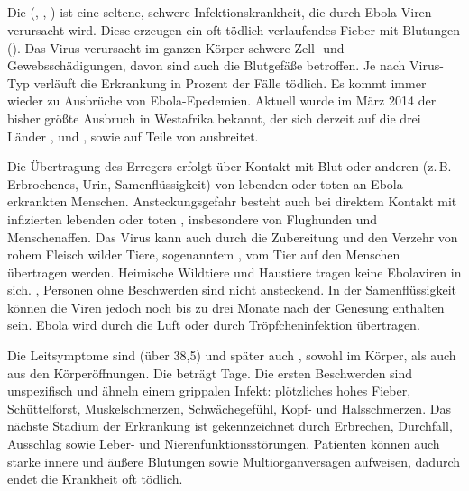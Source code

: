 \subsection{}

\Text{{\TxBeschreibung}}
{%
Die  
(, 
 , 
 ) 
ist eine seltene, 
schwere Infektionskrankheit, 
die durch Ebola-Viren
verursacht wird. 
%
Diese erzeugen ein oft tödlich verlaufendes Fieber 
mit Blutungen ().
Das Virus verursacht im ganzen Körper schwere Zell- und 
Gewebsschädigungen, davon sind auch die Blutgefäße betroffen. 
%
Je nach Virus-Typ verläuft die Erkrankung in  
Prozent der Fälle tödlich. 
%
Es kommt immer wieder zu Ausbrüche von Ebola-Epedemien.
%
Aktuell wurde im März 2014 der bisher größte Ausbruch in Westafrika bekannt, 
der sich derzeit auf 
die drei Länder
, 
und , 
sowie auf Teile von 
ausbreitet.



}
{}

{%
Die Übertragung des Erregers erfolgt über  Kontakt mit Blut 
oder anderen  
(z.\,B. Erbrochenes, Urin, Samenflüssigkeit) 
von lebenden oder toten an Ebola erkrankten
Menschen. 
%
Ansteckungsgefahr besteht auch bei direktem Kontakt mit infizierten lebenden 
oder toten , 
insbesondere von Flughunden und Menschenaffen.
% 
Das Virus kann auch durch die Zubereitung 
und den Verzehr von rohem Fleisch wilder Tiere, 
sogenanntem , 
vom Tier auf den Menschen übertragen werden. 
%
Heimische Wildtiere und Haustiere tragen keine Ebolaviren in
sich.
%
,
Personen ohne Beschwerden sind nicht ansteckend.
%
In der Samenflüssigkeit können die Viren jedoch noch bis zu drei Monate nach der Genesung enthalten sein.
%
Ebola wird  durch die Luft 
oder durch Tröpfcheninfektion übertragen.
}
{}

\Text{{\TxSymptome}}
{
Die Leitsymptome sind  (über 38,5\textcelsius) und später 
auch , sowohl im Körper, als auch aus den Körperöffnungen.
%
Die  beträgt  Tage. 
%
Die ersten Beschwerden sind unspezifisch
und ähneln einem grippalen Infekt: 
plötzliches hohes Fieber, 
Schüttelforst,
Muskelschmerzen, 
Schwächegefühl, 
Kopf- und Halsschmerzen. 
%
Das nächste Stadium der 
Erkrankung ist gekennzeichnet durch 
Erbrechen, 
Durchfall, 
Ausschlag 
sowie Leber- und Nierenfunktionsstörungen.
%
Patienten können auch starke innere und äußere Blutungen 
sowie Multiorganversagen aufweisen,
dadurch endet die Krankheit oft tödlich.  

}
{}

